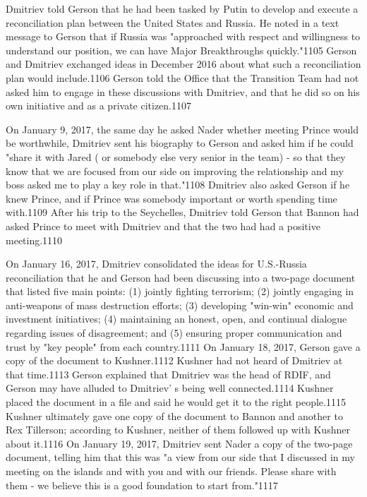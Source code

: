 Dmitriev told Gerson that he had been tasked by Putin to develop and execute a reconciliation plan between the United States and Russia. He noted in a  text message to Gerson that if Russia was "approached with respect and willingness to understand our position, we can have Major Breakthroughs quickly."1105 Gerson and Dmitriev exchanged ideas in December 2016 about what such a reconciliation plan would include.1106 Gerson told the Office that the Transition Team had not asked him to engage in these discussions with Dmitriev, and that he did so on his own initiative and as a private citizen.1107

On January 9, 2017, the same day he asked Nader whether meeting Prince would be worthwhile, Dmitriev sent his biography to Gerson and asked him if he could "share it with Jared ( or somebody else very senior in the team) -  so that they know that we are focused from our side on improving the relationship and my boss asked me to play a key role in that."1108 Dmitriev also asked Gerson if  he knew Prince, and if Prince was somebody important or worth spending time with.1109 After his trip to the Seychelles, Dmitriev told Gerson that Bannon had asked Prince to meet with Dmitriev and that the two had had a positive meeting.1110

On January 16, 2017, Dmitriev consolidated the ideas for U.S.-Russia reconciliation that he and Gerson had been discussing into a two-page document that listed five main points: (1) jointly fighting terrorism; (2) jointly engaging in anti-weapons of mass destruction efforts; (3) developing "win-win" economic and investment initiatives; (4) maintaining an honest, open, and continual dialogue regarding issues of disagreement; and (5) ensuring proper communication and trust by "key people"  from each country.1111 On January 18, 2017, Gerson gave a  copy of the document to Kushner.1112 Kushner had not heard of Dmitriev at that time.1113 Gerson explained that Dmitriev was the head of RDIF,  and Gerson may have alluded to Dmitriev' s  being well connected.1114 Kushner placed the document in a  file and said he would get it to the right people.1115 Kushner ultimately gave one copy of the document to Bannon and another to Rex Tillerson; according to Kushner,  neither of them followed up with Kushner about it.1116 On January 19, 2017, Dmitriev sent Nader a copy of the two-page document, telling him that this was "a view from our side that I  discussed in my meeting on the islands and with you and with our friends. Please share with them -  we believe this is a good foundation to start from."1117

